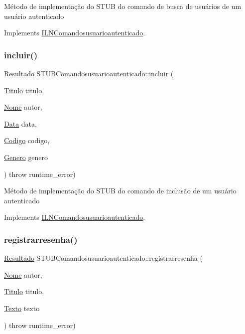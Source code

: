 Método de implementação do S\+T\+UB do comando de busca de usuários de um usuário autenticado 

Implements \hyperlink{classILNComandosusuarioautenticado}{I\+L\+N\+Comandosusuarioautenticado}.

\mbox{\label{classSTUBComandosusuarioautenticado_ab51b67eeaf6f9e8c97740472eb7efc64}} 
\subsubsection{\texorpdfstring{incluir()}{incluir()}}
{\footnotesize\ttfamily \hyperlink{classResultado}{Resultado} S\+T\+U\+B\+Comandosusuarioautenticado\+::incluir (\begin{DoxyParamCaption}\item[{\hyperlink{classTitulo}{Titulo}}]{titulo,  }\item[{\hyperlink{classNome}{Nome}}]{autor,  }\item[{\hyperlink{classData}{Data}}]{data,  }\item[{\hyperlink{classCodigo}{Codigo}}]{codigo,  }\item[{\hyperlink{classGenero}{Genero}}]{genero }\end{DoxyParamCaption}) throw  runtime\+\_\+error) \hspace{0.3cm}{\ttfamily [virtual]}}

Método de implementação do S\+T\+UB do comando de inclusão de um usuário autenticado 

Implements \hyperlink{classILNComandosusuarioautenticado}{I\+L\+N\+Comandosusuarioautenticado}.

\mbox{\label{classSTUBComandosusuarioautenticado_a4bac787ff5d5361dd74b6025820f02f5}} 
\subsubsection{\texorpdfstring{registrarresenha()}{registrarresenha()}}
{\footnotesize\ttfamily \hyperlink{classResultado}{Resultado} S\+T\+U\+B\+Comandosusuarioautenticado\+::registrarresenha (\begin{DoxyParamCaption}\item[{\hyperlink{classNome}{Nome}}]{autor,  }\item[{\hyperlink{classTitulo}{Titulo}}]{titulo,  }\item[{\hyperlink{classTexto}{Texto}}]{texto }\end{DoxyParamCaption}) throw  runtime\+\_\+error) \hspace{0.3cm}{\ttfamily [virtual]}}


